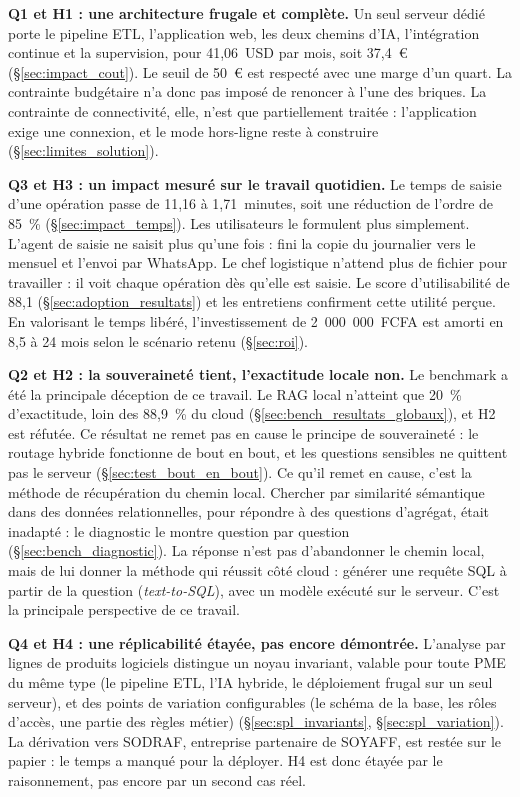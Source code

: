 \textbf{Q1 et H1 : une architecture frugale et complète.} Un seul serveur dédié porte le pipeline ETL, l'application web, les deux chemins d'IA, l'intégration continue et la supervision, pour 41,06~USD par mois, soit 37,4~€ (§\ref{sec:impact_cout}). Le seuil de 50~€ est respecté avec une marge d'un quart. La contrainte budgétaire n'a donc pas imposé de renoncer à l'une des briques. La contrainte de connectivité, elle, n'est que partiellement traitée : l'application exige une connexion, et le mode hors-ligne reste à construire (§\ref{sec:limites_solution}).

\textbf{Q3 et H3 : un impact mesuré sur le travail quotidien.} Le temps de saisie d'une opération passe de 11,16 à 1,71~minutes, soit une réduction de l'ordre de 85~\% (§\ref{sec:impact_temps}). Les utilisateurs le formulent plus simplement. L'agent de saisie ne saisit plus qu'une fois : fini la copie du journalier vers le mensuel et l'envoi par WhatsApp. Le chef logistique n'attend plus de fichier pour travailler : il voit chaque opération dès qu'elle est saisie. Le score d'utilisabilité de 88,1 (§\ref{sec:adoption_resultats}) et les entretiens confirment cette utilité perçue. En valorisant le temps libéré, l'investissement de 2~000~000~FCFA est amorti en 8,5 à 24 mois selon le scénario retenu (§\ref{sec:roi}).

\textbf{Q2 et H2 : la souveraineté tient, l'exactitude locale non.} Le benchmark a été la principale déception de ce travail. Le RAG local n'atteint que 20~\% d'exactitude, loin des 88,9~\% du cloud (§\ref{sec:bench_resultats_globaux}), et H2 est réfutée. Ce résultat ne remet pas en cause le principe de souveraineté : le routage hybride fonctionne de bout en bout, et les questions sensibles ne quittent pas le serveur (§\ref{sec:test_bout_en_bout}). Ce qu'il remet en cause, c'est la méthode de récupération du chemin local. Chercher par similarité sémantique dans des données relationnelles, pour répondre à des questions d'agrégat, était inadapté : le diagnostic le montre question par question (§\ref{sec:bench_diagnostic}). La réponse n'est pas d'abandonner le chemin local, mais de lui donner la méthode qui réussit côté cloud : générer une requête SQL à partir de la question (\textit{text-to-SQL}), avec un modèle exécuté sur le serveur. C'est la principale perspective de ce travail.

\textbf{Q4 et H4 : une réplicabilité étayée, pas encore démontrée.} L'analyse par lignes de produits logiciels distingue un noyau invariant, valable pour toute PME du même type (le pipeline ETL, l'IA hybride, le déploiement frugal sur un seul serveur), et des points de variation configurables (le schéma de la base, les rôles d'accès, une partie des règles métier) (§\ref{sec:spl_invariants}, §\ref{sec:spl_variation}). La dérivation vers SODRAF, entreprise partenaire de SOYAFF, est restée sur le papier : le temps a manqué pour la déployer. H4 est donc étayée par le raisonnement, pas encore par un second cas réel.


